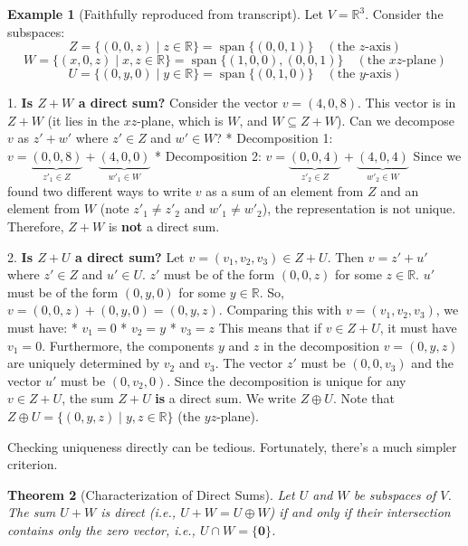 \documentclass[11pt]{article}
\theoremstyle{plain}
\newtheorem{theorem}{Theorem}[section]
\theoremstyle{definition}
\newtheorem{example}[theorem]{Example}
\theoremstyle{remark}
\DeclareMathOperator{\spanv}{span}
\newcommand{\R}{\mathbb{R}}
\newcommand{\veczero}{\mathbf{0}} %
\begin{document}
\begin{example}[Faithfully reproduced from transcript]
Let $V = \R^3$. Consider the subspaces:
\[ Z = \{ (0, 0, z) \mid z \in \R \} = \spanv\{(0, 0, 1)\} \quad (\text{the } z\text{-axis}) \]
\[ W = \{ (x, 0, z) \mid x, z \in \R \} = \spanv\{(1, 0, 0), (0, 0, 1)\} \quad (\text{the } xz\text{-plane}) \]
\[ U = \{ (0, y, 0) \mid y \in \R \} = \spanv\{(0, 1, 0)\} \quad (\text{the } y\text{-axis}) \]

1.  \textbf{Is $Z+W$ a direct sum?}
    Consider the vector $v = (4, 0, 8)$. This vector is in $Z+W$ (it lies in the $xz$-plane, which is $W$, and $W \subseteq Z+W$).
    Can we decompose $v$ as $z' + w'$ where $z' \in Z$ and $w' \in W$?
    *   Decomposition 1: $v = \underbrace{(0, 0, 8)}_{z'_1 \in Z} + \underbrace{(4, 0, 0)}_{w'_1 \in W}$
    *   Decomposition 2: $v = \underbrace{(0, 0, 4)}_{z'_2 \in Z} + \underbrace{(4, 0, 4)}_{w'_2 \in W}$
    Since we found two different ways to write $v$ as a sum of an element from $Z$ and an element from $W$ (note $z'_1 \neq z'_2$ and $w'_1 \neq w'_2$), the representation is not unique.
    Therefore, $Z+W$ is \textbf{not} a direct sum.

2.  \textbf{Is $Z+U$ a direct sum?}
    Let $v = (v_1, v_2, v_3) \in Z+U$. Then $v = z' + u'$ where $z' \in Z$ and $u' \in U$.
    $z'$ must be of the form $(0, 0, z)$ for some $z \in \R$.
    $u'$ must be of the form $(0, y, 0)$ for some $y \in \R$.
    So, $v = (0, 0, z) + (0, y, 0) = (0, y, z)$.
    Comparing this with $v = (v_1, v_2, v_3)$, we must have:
    *   $v_1 = 0$
    *   $v_2 = y$
    *   $v_3 = z$
    This means that if $v \in Z+U$, it must have $v_1=0$. Furthermore, the components $y$ and $z$ in the decomposition $v = (0, y, z)$ are uniquely determined by $v_2$ and $v_3$. The vector $z'$ must be $(0, 0, v_3)$ and the vector $u'$ must be $(0, v_2, 0)$.
    Since the decomposition is unique for any $v \in Z+U$, the sum $Z+U$ \textbf{is} a direct sum. We write $Z \oplus U$. Note that $Z \oplus U = \{ (0, y, z) \mid y, z \in \R \}$ (the $yz$-plane).
\end{example}

Checking uniqueness directly can be tedious. Fortunately, there's a much simpler criterion.

\begin{theorem}[Characterization of Direct Sums]
Let $U$ and $W$ be subspaces of $V$. The sum $U+W$ is direct (i.e., $U+W = U \oplus W$) if and only if their intersection contains only the zero vector, i.e., $U \cap W = \{\veczero\}$.
\end{theorem}
\end{document}
